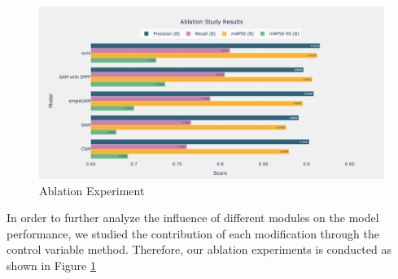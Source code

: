 \documentclass[10pt]{article}
\begin{document}

\begin{figure}[!h]
\centering
\includegraphics[width=\linewidth]{images/ablation_study.png}
\caption{Ablation Experiment}
\label{fig:ablation}
\end{figure}
In order to further analyze the influence of different modules on the model performance, we studied the contribution of each modification through the control variable method. Therefore, our ablation experiments is conducted as shown in Figure \ref{fig:ablation}
\end{document}
